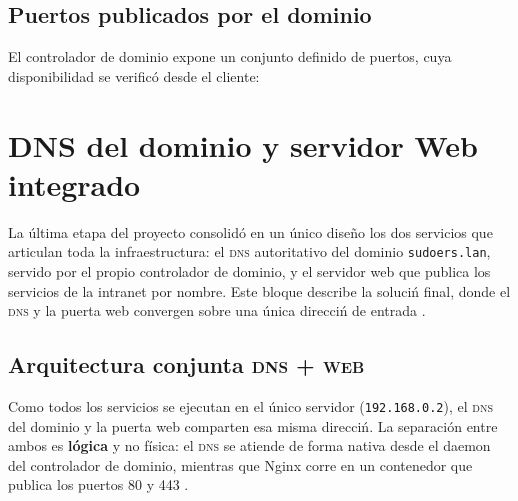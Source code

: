 
\subsection{Puertos publicados por el dominio}

El controlador de dominio expone un conjunto definido de puertos, cuya
disponibilidad se verific\'o desde el cliente:


\section{DNS del dominio y servidor Web integrado}

La \'ultima etapa del proyecto consolid\'o en un \'unico dise\~no los dos
servicios que articulan toda la infraestructura: el \textsc{dns} autoritativo
del dominio \texttt{sudoers.lan}, servido por el propio controlador de
dominio, y el servidor web que publica los servicios de la intranet por
nombre. Este bloque describe la soluci\'n final, donde el \textsc{dns} y la
puerta web convergen sobre una \'unica direcci\'n de entrada \cite{rfc1034}.

\subsection{Arquitectura conjunta \textsc{dns} + \textsc{web}}

Como todos los servicios se ejecutan en el \'unico servidor
(\texttt{192.168.0.2}), el \textsc{dns} del dominio y la puerta web comparten
esa misma direcci\'n. La separaci\'on entre ambos es \textbf{l\'ogica} y no
f\'isica: el \textsc{dns} se atiende de forma nativa desde el daemon del
controlador de dominio, mientras que Nginx corre en un contenedor que
publica los puertos 80 y 443 \cite{tanenbaum2017}.

